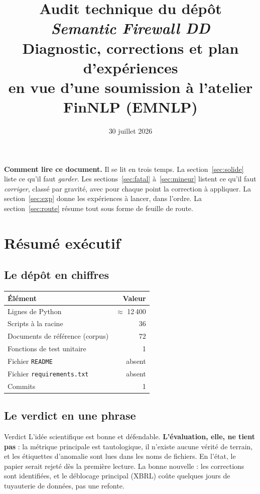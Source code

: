 \documentclass[11pt,a4paper]{article}
\title{\vspace{-1.5cm}\textbf{Audit technique du dépôt \textit{Semantic Firewall DD}}\\[4pt]
\large Diagnostic, corrections et plan d'expériences\\[2pt]
\normalsize en vue d'une soumission à l'atelier FinNLP (EMNLP)}
\author{}
\date{30 juillet 2026}
\newcommand{\fic}[1]{\texttt{\small #1}}
\begin{document}
\maketitle
\thispagestyle{fancy}

\begin{tcolorbox}[colback=cMineurBg, colframe=cMineur, boxrule=0.6pt, arc=2pt]
\textbf{Comment lire ce document.} Il se lit en trois temps. La
section~\ref{sec:solide} liste ce qu'il faut \emph{garder}. Les
sections~\ref{sec:fatal} à~\ref{sec:mineur} listent ce qu'il faut
\emph{corriger}, classé par gravité, avec pour chaque point la correction à
appliquer. La section~\ref{sec:exp} donne les expériences à lancer, dans
l'ordre. La section~\ref{sec:route} résume tout sous forme de feuille de route.
\end{tcolorbox}

\section{Résumé exécutif}

\subsection*{Le dépôt en chiffres}

\begin{center}
\begin{tabular}{@{}lr@{}}
\toprule
\textbf{Élément} & \textbf{Valeur} \\
\midrule
Lignes de Python & $\approx$ 12\,400 \\
Scripts à la racine & 36 \\
Documents de référence (corpus) & 72 \\
Fonctions de test unitaire & 1 \\
Fichier \fic{README} & absent \\
Fichier \fic{requirements.txt} & absent \\
Commits & 1 \\
\bottomrule
\end{tabular}
\end{center}

\subsection*{Le verdict en une phrase}

\begin{fatal}{Verdict}
L'idée scientifique est bonne et défendable. \textbf{L'évaluation, elle, ne
tient pas} : la métrique principale est tautologique, il n'existe aucune
vérité de terrain, et les étiquettes d'anomalie sont lues dans les noms de
fichiers. En l'état, le papier serait rejeté dès la première lecture. La bonne
nouvelle : les corrections sont identifiées, et le déblocage principal (XBRL)
coûte quelques jours de tuyauterie de données, pas une refonte.
\end{fatal}
\end{document}
